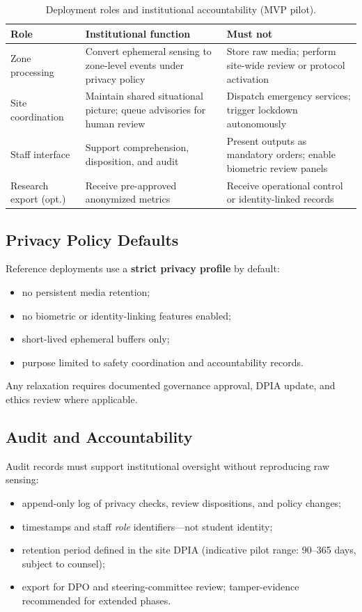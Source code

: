 \begin{table}[htbp]
  \centering
  \caption{Deployment roles and institutional accountability (MVP pilot).}
  \label{tab:deployment-roles}
  \small
  \begin{tabular}{@{}p{3.0cm}p{5.2cm}p{4.8cm}@{}}
    \toprule
    Role & Institutional function & Must not \\
    \midrule
    Zone processing &
      Convert ephemeral sensing to zone-level events under privacy policy &
      Store raw media; perform site-wide review or protocol activation \\
    Site coordination &
      Maintain shared situational picture; queue advisories for human review &
      Dispatch emergency services; trigger lockdown autonomously \\
    Staff interface &
      Support comprehension, disposition, and audit &
      Present outputs as mandatory orders; enable biometric review panels \\
    Research export (opt.) &
      Receive pre-approved anonymized metrics &
      Receive operational control or identity-linked records \\
    \bottomrule
  \end{tabular}
\end{table}

\subsection{Privacy Policy Defaults}

Reference deployments use a \textbf{strict privacy profile} by default:
\begin{itemize}[noitemsep]
  \item no persistent media retention;
  \item no biometric or identity-linking features enabled;
  \item short-lived ephemeral buffers only;
  \item purpose limited to safety coordination and accountability records.
\end{itemize}

Any relaxation requires documented governance approval, DPIA update, and ethics review
where applicable.

\subsection{Audit and Accountability}

Audit records must support institutional oversight without reproducing raw sensing:
\begin{itemize}[noitemsep]
  \item append-only log of privacy checks, review dispositions, and policy changes;
  \item timestamps and staff \emph{role} identifiers---not student identity;
  \item retention period defined in the site DPIA (indicative pilot range: 90--365 days,
        subject to counsel);
  \item export for DPO and steering-committee review; tamper-evidence recommended for
        extended phases.
\end{itemize}

